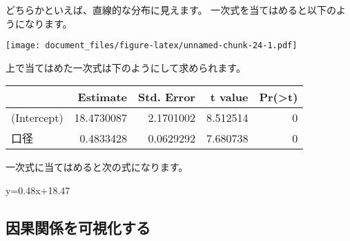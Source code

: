 \documentclass[]{article}
\newenvironment{Shaded}{\begin{snugshade}}{\end{snugshade}}
\newcommand{\DataTypeTok}[1]{\textcolor[rgb]{0.13,0.29,0.53}{#1}}
\newcommand{\KeywordTok}[1]{\textcolor[rgb]{0.13,0.29,0.53}{\textbf{#1}}}
\newcommand{\NormalTok}[1]{#1}
\newcommand{\OperatorTok}[1]{\textcolor[rgb]{0.81,0.36,0.00}{\textbf{#1}}}
\newcommand{\StringTok}[1]{\textcolor[rgb]{0.31,0.60,0.02}{#1}}
\begin{document}
どちらかといえば、直線的な分布に見えます。
一次式を当てはめると以下のようになります。

\begin{Shaded}
\end{Shaded}

\texttt{[image: document\_files/figure-latex/unnamed-chunk-24-1.pdf]}

上で当てはめた一次式は下のようにして求められます。

\begin{Shaded}
\end{Shaded}

\begin{longtable}[]{@{}lrrrr@{}}
\toprule
& Estimate & Std. Error & t value &
Pr(\textgreater{}\textbar{}t\textbar{})\tabularnewline
\midrule
\endhead
(Intercept) & 18.4730087 & 2.1701002 & 8.512514 & 0\tabularnewline
口径 & 0.4833428 & 0.0629292 & 7.680738 & 0\tabularnewline
\bottomrule
\end{longtable}

一次式に当てはめると次の式になります。

y=0.48x+18.47

\subsection{因果関係を可視化する}
\end{document}
